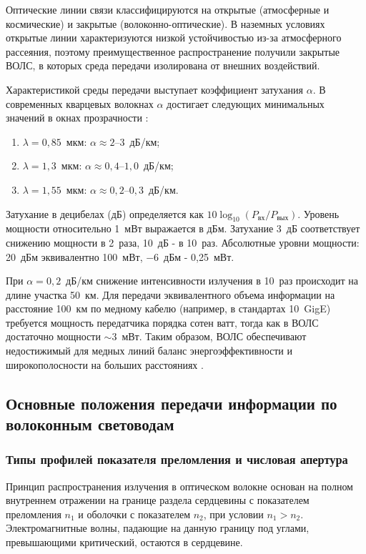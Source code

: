 \documentclass[14pt,a4paper]{extarticle}
\numberwithin{equation}{section}
\numberwithin{figure}{section}
\numberwithin{table}{section}
\begin{document}
Оптические линии связи классифицируются на открытые (атмосферные и космические) и закрытые (волоконно-оптические). В наземных условиях открытые линии характеризуются низкой устойчивостью из-за атмосферного рассеяния, поэтому преимущественное распространение получили закрытые ВОЛС, в которых среда передачи изолирована от внешних воздействий.

Характеристикой среды передачи выступает коэффициент затухания $\alpha$. В современных кварцевых волокнах $\alpha$ достигает следующих минимальных значений в окнах прозрачности \cite{Slepov}:
\begin{enumerate}
    \item[--] $\lambda = 0{,}85$~мкм: $\alpha \approx 2$--$3$~дБ/км;
    \item[--] $\lambda = 1{,}3$~мкм: $\alpha \approx 0{,}4$--$1{,}0$~дБ/км;
    \item[--] $\lambda = 1{,}55$~мкм: $\alpha \approx 0{,}2$--$0{,}3$~дБ/км.
\end{enumerate}

Затухание в децибелах (дБ) определяется как $10 \log_{10}(P_{\text{вх}}/P_{\text{вых}})$. Уровень мощности относительно 1~мВт выражается в дБм. Затухание 3~дБ соответствует снижению мощности в 2~раза, 10~дБ - в 10~раз. Абсолютные уровни мощности: 20~дБм эквивалентно 100~мВт, $-6$~дБм - 0,25~мВт.

При $\alpha = 0{,}2$~дБ/км снижение интенсивности излучения в 10~раз происходит на длине участка 50~км. Для передачи эквивалентного объема информации на расстояние 100~км по медному кабелю (например, в стандартах 10~GigE) требуется мощность передатчика порядка сотен ватт, тогда как в ВОЛС достаточно мощности $\sim 3$~мВт. Таким образом, ВОЛС обеспечивают недостижимый для медных линий баланс энергоэффективности и широкополосности на больших расстояниях \cite{Burdin,Slepov}.



\subsection{Основные положения передачи  
информации по волоконным световодам}

\subsubsection{Типы профилей показателя преломления и числовая апертура}

Принцип распространения излучения в оптическом волокне основан на полном внутреннем отражении на границе раздела сердцевины с показателем преломления $n_1$ и оболочки с показателем $n_2$, при условии $n_1 > n_2$. Электромагнитные волны, падающие на данную границу под углами, превышающими критический, остаются в сердцевине.
\end{document}
